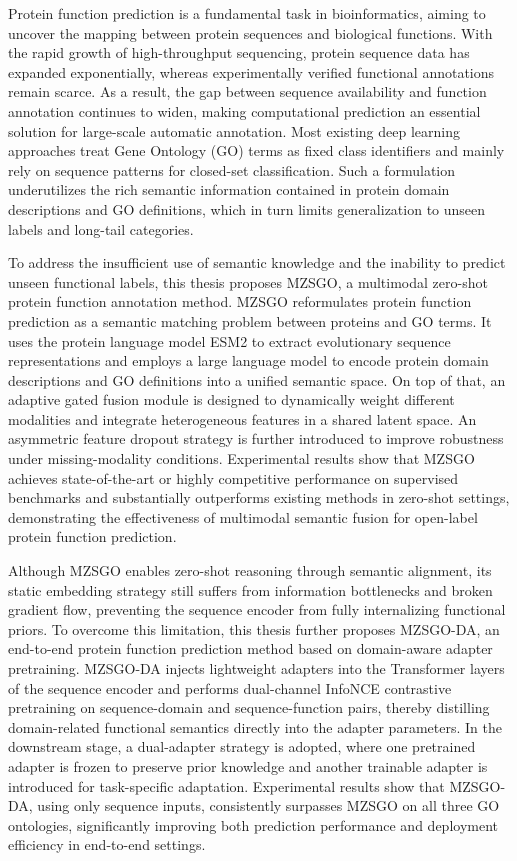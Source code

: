 \begin{eabstract}

Protein function prediction is a fundamental task in bioinformatics, aiming to uncover the mapping between protein sequences and biological functions. With the rapid growth of high-throughput sequencing, protein sequence data has expanded exponentially, whereas experimentally verified functional annotations remain scarce. As a result, the gap between sequence availability and function annotation continues to widen, making computational prediction an essential solution for large-scale automatic annotation. Most existing deep learning approaches treat Gene Ontology (GO) terms as fixed class identifiers and mainly rely on sequence patterns for closed-set classification. Such a formulation underutilizes the rich semantic information contained in protein domain descriptions and GO definitions, which in turn limits generalization to unseen labels and long-tail categories.

To address the insufficient use of semantic knowledge and the inability to predict unseen functional labels, this thesis proposes MZSGO, a multimodal zero-shot protein function annotation method. MZSGO reformulates protein function prediction as a semantic matching problem between proteins and GO terms. It uses the protein language model ESM2 to extract evolutionary sequence representations and employs a large language model to encode protein domain descriptions and GO definitions into a unified semantic space. On top of that, an adaptive gated fusion module is designed to dynamically weight different modalities and integrate heterogeneous features in a shared latent space. An asymmetric feature dropout strategy is further introduced to improve robustness under missing-modality conditions. Experimental results show that MZSGO achieves state-of-the-art or highly competitive performance on supervised benchmarks and substantially outperforms existing methods in zero-shot settings, demonstrating the effectiveness of multimodal semantic fusion for open-label protein function prediction.

Although MZSGO enables zero-shot reasoning through semantic alignment, its static embedding strategy still suffers from information bottlenecks and broken gradient flow, preventing the sequence encoder from fully internalizing functional priors. To overcome this limitation, this thesis further proposes MZSGO-DA, an end-to-end protein function prediction method based on domain-aware adapter pretraining. MZSGO-DA injects lightweight adapters into the Transformer layers of the sequence encoder and performs dual-channel InfoNCE contrastive pretraining on sequence-domain and sequence-function pairs, thereby distilling domain-related functional semantics directly into the adapter parameters. In the downstream stage, a dual-adapter strategy is adopted, where one pretrained adapter is frozen to preserve prior knowledge and another trainable adapter is introduced for task-specific adaptation. Experimental results show that MZSGO-DA, using only sequence inputs, consistently surpasses MZSGO on all three GO ontologies, significantly improving both prediction performance and deployment efficiency in end-to-end settings.

\end{eabstract}
